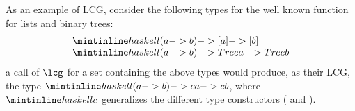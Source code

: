 As an example of LCG, consider the following types for
the well known  function for lists and binary trees:
\[
  \begin{array}{l}
       \haskell{(a -> b) -> [a] -> [b]}\\
       \haskell{(a -> b) -> Tree a -> Tree b}
  \end{array}
\]
a call of $\lcg$ for a set containing the above types would produce,
as their LCG, the type $\haskell{(a -> b) -> c a -> c b}$, where $\haskell{c}$ generalizes the different type
constructors (\haskell{[]} and ). 